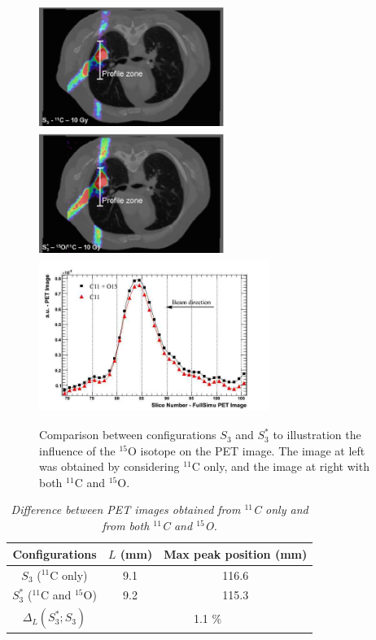 \documentclass[11pt]{iopart}
\begin{document}
\begin{figure}[!htbp]
  \begin{center}
    \includegraphics[width=6cm,height=40mm]{figures/C11_10Gy_v2.jpg}   
    \includegraphics[width=60mm,height=40mm]{figures/C11_O15_10Gy_v2.jpg}
    \includegraphics[width=75mm,height=50mm]{figures/prof_C11_O15_10Gy_v3.jpg}
    \caption{Comparison between configurations $S_{3}$ and $S_{3}^{*}$
      to illustration the influence of the $^{15}$O isotope on the PET
      image. The image at left was obtained by considering $^{11}$C
      only, and the image at right with both $^{11}$C and $^{15}$O.}
  \end{center}
  \label{fig:fig4}
\end{figure}

\begin{table}[htbp]
\begin{center}
\begin{tabular}{|c|c|c|} \hline
 Configurations                & $L$ (mm)            & Max peak
 position (mm)       \\\hline
$S_{3}$  ($^{11}$C only)                   & 9.1                  &  116.6                       \\ \hline
$S_{3}^{*}$ ($^{11}$C and $^{15}$O)          & 9.2                  &  115.3               \\ \hline
$\Delta_{L}(S_{3}^{*};S_{3})$         &        \multicolumn{2}{c|}{1.1 $\%$}     \\ \hline\hline
\end{tabular}
\end{center} 
\caption{\it Difference between PET images obtained from $^{11}$C only
  and from both $^{11}$C and $^{15}$O.}
\label{tab:O15}
\end{table}
\end{document}
